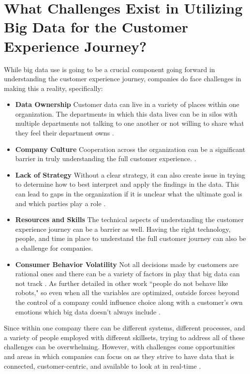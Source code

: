 \documentclass[sigconf]{acmart}
\begin{document}
\section{What Challenges Exist in Utilizing Big Data for the Customer Experience Journey?}
While big data use is going to be a crucial component going forward in understanding the customer experience journey, companies do face challenges in making this a reality, specifically:
\begin{itemize}
\item \textbf{Data Ownership} Customer data can live in a variety of places within one organization. The departments in which this data lives can be in silos with multiple departments not talking to one another or not willing to share what they feel their department owns \cite{Spiess2014}. 
\item \textbf{Company Culture} Cooperation across the organization can be a significant barrier in truly understanding the full customer experience. \cite{Spiess2014}.  
\item \textbf{Lack of Strategy} Without a clear strategy, it can also create issue in trying to determine how to best interpret and apply the findings in the data. This can lead to gaps in the organization if it is unclear what the ultimate goal is and which parties play a role \cite{Spiess2014}. 
\item \textbf{Resources and Skills} The technical aspects of understanding the customer experience journey can be a barrier as well. Having the right technology, people, and time in place to understand the full customer journey can also be a challenge for companies. \cite{Court2015}
\item \textbf{Consumer Behavior Volatility} Not all decisions made by customers are rational ones and there can be a variety of factors in play that big data can not track \cite{Stoicescu2015}. As further detailed in other work ``people do not behave like robots," so even when all the variables are optimized, outside forces beyond the control of a company could influence choice along with a customer's own emotions which big data doesn't always include \cite{Richardson2010}. 
\end{itemize}
Since within one company there can be different systems, different processes, and a variety of people employed with different skillsets, trying to address all of these challenges can be overwhelming. However, with challenges come opportunities and areas in which companies can focus on as they strive to have data that is connected, customer-centric, and available to look at in real-time \cite{Spiess2014}. 
\end{document}
